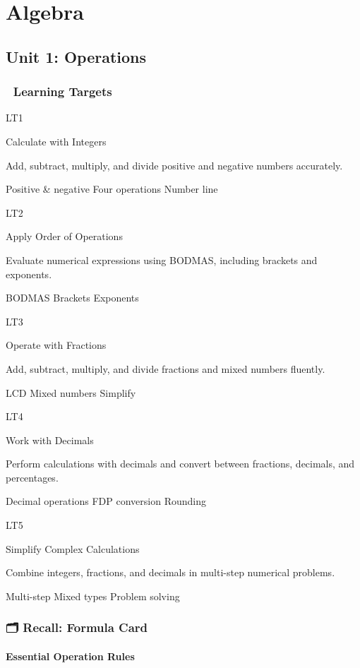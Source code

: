 \documentclass[
  letterpaper,
  DIV=11,
  numbers=noendperiod]{scrreprt}
\theoremstyle{definition}
\theoremstyle{remark}
\begin{document}
\part{Algebra}

\chapter{Unit 1: Operations}\label{unit-1-operations}

\section{🎯 Learning Targets}\label{learning-targets}

LT1

Calculate with Integers

Add, subtract, multiply, and divide positive and negative numbers
accurately.

{Positive \& negative} {Four operations} {Number line}

LT2

Apply Order of Operations

Evaluate numerical expressions using BODMAS, including brackets and
exponents.

{BODMAS} {Brackets} {Exponents}

LT3

Operate with Fractions

Add, subtract, multiply, and divide fractions and mixed numbers
fluently.

{LCD} {Mixed numbers} {Simplify}

LT4

Work with Decimals

Perform calculations with decimals and convert between fractions,
decimals, and percentages.

{Decimal operations} {FDP conversion} {Rounding}

LT5

Simplify Complex Calculations

Combine integers, fractions, and decimals in multi-step numerical
problems.

{Multi-step} {Mixed types} {Problem solving}

\section{🗂️ Recall: Formula Card}\label{recall-formula-card}

\subsection*{Essential Operation Rules}\label{essential-operation-rules}
\end{document}
